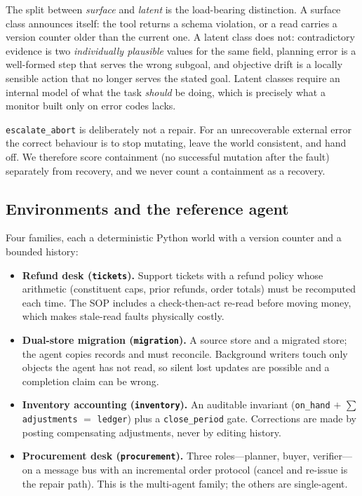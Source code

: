 The split between \emph{surface} and \emph{latent} is the load-bearing distinction. A surface class
announces itself: the tool returns a schema violation, or a read carries a version counter older
than the current one. A latent class does not: contradictory evidence is two {\em individually
plausible\/} values for the same field, planning error is a well-formed step that serves the wrong
subgoal, and objective drift is a locally sensible action that no longer serves the stated goal.
Latent classes require an internal model of what the task \emph{should} be doing, which is precisely
what a monitor built only on error codes lacks.

\texttt{escalate\_abort} is deliberately not a repair. For an unrecoverable external error the
correct behaviour is to stop mutating, leave the world consistent, and hand off. We therefore score
containment (no successful mutation after the fault) separately from recovery, and we never count a
containment as a recovery.

\subsection{Environments and the reference agent}

Four families, each a deterministic Python world with a version counter and a bounded history:

\begin{itemize}
\item \textbf{Refund desk (\texttt{tickets}).} Support tickets with a refund policy whose arithmetic
(constituent caps, prior refunds, order totals) must be recomputed each time. The SOP includes a
check-then-act re-read before moving money, which makes stale-read faults physically costly.
\item \textbf{Dual-store migration (\texttt{migration}).} A source store and a migrated store; the
agent copies records and must reconcile. Background writers touch only objects the agent has not
read, so silent lost updates are possible and a completion claim can be wrong.
\item \textbf{Inventory accounting (\texttt{inventory}).} An auditable invariant
(\texttt{on\_hand} $+$ $\sum$ \texttt{adjustments} $=$ \texttt{ledger}) plus a \texttt{close\_period}
gate. Corrections are made by posting compensating adjustments, never by editing history.
\item \textbf{Procurement desk (\texttt{procurement}).} Three roles---planner, buyer, verifier---on a
message bus with an incremental order protocol (cancel and re-issue is the repair path). This is the
multi-agent family; the others are single-agent.
\end{itemize}


